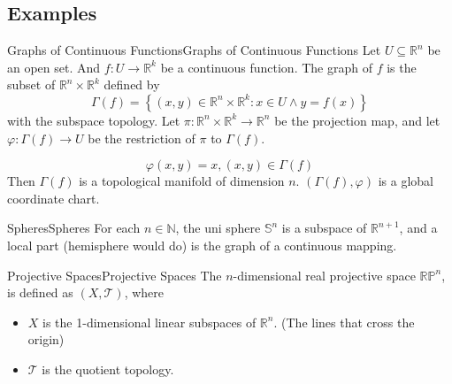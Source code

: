 \documentclass{mathnote}
\begin{document}
\subsection{Examples}

\begin{example}{Graphs of Continuous Functions}{Graphs of Continuous Functions}
Let $U \subseteq \mathbb{R}^n$ be an open set. And $f: U \rightarrow \mathbb{R}^k$ be a continuous function. The graph of $f$ is the subset of $\mathbb{R}^n \times \mathbb{R}^k$ defined by
\begin{equation}
\Gamma(f) = \left\{ (x,y)\in \mathbb{R}^n \times \mathbb{R}^k: x\in U \land y = f(x) \right\}
\end{equation}
with the subspace topology. Let $\pi: \mathbb{R}^n \times \mathbb{R}^k \rightarrow \mathbb{R}^n$ be the projection map, and let $\varphi: \Gamma(f) \rightarrow U$ be the restriction of $\pi$ to $\Gamma(f)$.

\begin{equation*}
\varphi(x,y) = x, (x,y)\in \Gamma(f)
\end{equation*}
Then $\Gamma(f)$ is a topological manifold of dimension $n$. $(\Gamma(f),\varphi)$ is a global coordinate chart.
\end{example}
\begin{example}{Spheres}{Spheres}
For each $n\in \mathbb{N}$, the uni sphere $\mathbb{S}^n$ is a subspace of $\mathbb{R}^{n+1}$, and a local part (hemisphere would do) is the graph of a continuous mapping.
\end{example}
\begin{example}{Projective Spaces}{Projective Spaces}
The $n$-dimensional real projective space $\mathbb{R}\mathbb{P}^n$, is defined as $(X,\mathcal{T})$, where
\begin{itemize}
\item $X$ is the 1-dimensional linear subspaces of  $\mathbb{R}^n$. (The lines that cross the origin)
\item $\mathcal{T}$ is the quotient topology.
\end{itemize}
\end{example}
\end{document}
